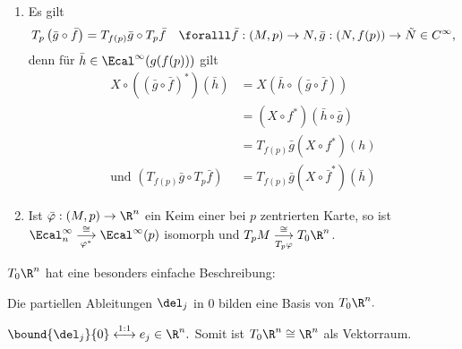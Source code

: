 \begin{rem*}
	\begin{enumerate}[label={\roman*})]
		\item Es gilt 
		$$ T_p \left( \bar{g} \circ \bar{f} \right) = T_{f(p)} \bar{g} \circ T_p\bar{f}\quad \foralll \bar{f}: (M,p) \to N, \bar{g}: (N,f(p)) \to \tilde{N} \in C^\infty, $$
		denn für $\bar{h} \in \Ecal^\infty (g(f(p)))$ gilt
		\begin{align*}
			X \circ \left( \left( \bar{g} \circ \bar{f} \right)^* \right) \left( \bar{h} \right) &= X \left( \bar{h} \circ \left( \bar{g} \circ \bar{f} \right) \right)\\
			&= \left( X \circ f^* \right) \left( \bar{h} \circ \bar{g} \right)\\
			&= T_{f(p)}\bar{g} \left( X \circ f^* \right)(h)\\
			\text{und } \left( T_{f(p)} \bar{g} \circ T_p\bar{f} \right) &= T_{f(p)}\bar{g} \left( X \circ \bar{f}^* \right)\left( \bar{h} \right)
		\end{align*}
		\item Ist $\bar{\varphi}: (M,p) \to \R^n$ ein Keim einer bei $p$ zentrierten Karte, so ist $ \Ecal_n^\infty \overset{\cong}{\underset{\varphi^*}{\longrightarrow}} \Ecal^\infty(p) $ isomorph und $ T_pM \overset{\cong}{\underset{T_p \varphi}{\longrightarrow}} T_0\R^n $. 
	\end{enumerate}
\end{rem*}

$T_0\R^n$ hat eine besonders einfache Beschreibung:

\begin{lem}
	Die partiellen Ableitungen $ \del_j $ in 0 bilden eine Basis von $ T_0\R^n. $
\end{lem}

\begin{rem*}
	$ \bound{\del_j}{0} \overset{1:1}{\longleftrightarrow} e_j \in \R^n. $ Somit ist $ T_0\R^n \cong \R^n $ als Vektorraum.
\end{rem*}

